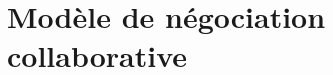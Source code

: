 \documentclass[a4paper, 11pt]{book}
\begin{document}
	\chapter{Modèle de négociation collaborative}
	
	
	
	
\end{document}
